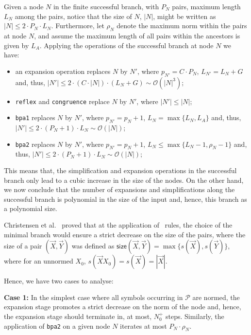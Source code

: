 Given a node $N$ in the finite successful branch, with $P_N$ pairs,
maximum length $L_N$ among the pairs, notice that the size of $N$,
$|N|$, might be written as $|N|\leq 2\cdot P_N \cdot L_N$. Furthermore,
let $\rho_N$ denote the maximum norm within the pairs at node $N$,
and assume the maximum
length of all pairs within the ancestors is given by $L_A$. Applying
the operations of the successful branch at node $N$ we have:
\begin{itemize}
\item an expansion operation replaces $N$ by $N'$, where
	  $p_{N'}=C\cdot P_N$, $L_{N'}=L_N+G$ and, thus,
	  $|N'|\leq 2\cdot(C\cdot |N|)\cdot (L_N+G) \sim \mathcal{O}(|N|^3)$;
\item \lstinline|reflex| and \lstinline|congruence| replace $N$ by $N'$, 
	  where $|N'|\leq|N|$;
\item \lstinline|bpa1| replaces $N$ by $N'$, where
	  $p_{N'}=p_N+1$, $L_N=\max\{L_N,L_A\}$ and, thus,
	  $|N'|\leq 2\cdot(P_N+1)\cdot L_N\sim \mathcal{O}(|N|)$;
\item \lstinline|bpa2| replaces $N$ by $N'$, where
	  $p_{N'}=p_N+1$, $L_N\leq \max\{L_N-1,\rho_N-1\}$ and, thus,
	  $|N'|\leq 2\cdot(P_N+1)\cdot L_N\sim \mathcal{O}(|N|)$;
\end{itemize}

This means that, the simplification and expansion operations in the successful
branch only lead to a cubic increase in the size of the nodes. On
the other hand, we now conclude that the number of expansions and
simplifications along the successful branch is polynomial in the 
size of the input and, hence, this branch as a polynomial size.

Christensen et al.~\cite{DBLP:journals/iandc/ChristensenHS95} proved
that at the application of \BPA\ rules, the choice of the minimal branch
would ensure a strict decrease on the size of the pairs, where the 
size of a pair $(\vec X, \vec Y)$ was defined as 
$\mathsf{size}(\vec X, \vec Y) = \max\{s(\vec X), s(\vec Y)\}$, 
where for an unnormed $X_0$, $s(\vec X X_0) = s(\vec X ) = |\vec X|$. 

Hence, we have two cases to analyse:

\noindent\textbf{Case 1:} In the simplest case where all symbols
occurring in $\mathcal{P}$ are normed, the expansion stage 
promotes a strict decrease on the norm of the node and, hence,
the expansion stage should terminate in, at most, $N_0^+$ steps. 
Similarly, the application of \lstinline{bpa2} 
on a given node $N$ iterates at most 
$P_N\cdot \rho_N$. 
 \smallskip

